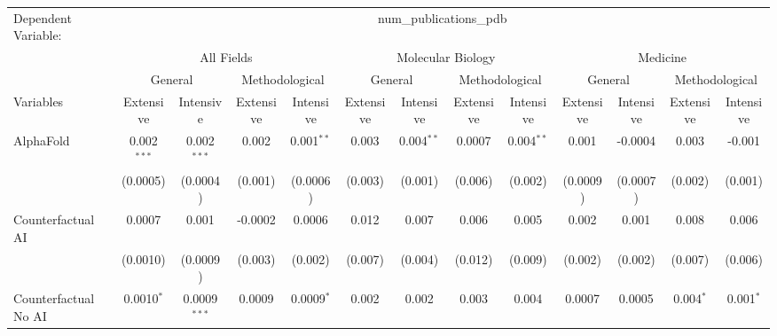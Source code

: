 \begingroup
\centering
\begin{tabular}{lcccccccccccc}
   \tabularnewline \midrule \midrule
   Dependent Variable: & \multicolumn{12}{c}{num\_publications\_pdb}\\
 & \multicolumn{4}{c}{All Fields} & \multicolumn{4}{c}{Molecular Biology} & \multicolumn{4}{c}{Medicine} \\
\cmidrule(lr){2-5} \cmidrule(lr){6-9} \cmidrule(lr){10-13}
 & \multicolumn{2}{c}{General} & \multicolumn{2}{c}{Methodological} & \multicolumn{2}{c}{General} & \multicolumn{2}{c}{Methodological} & \multicolumn{2}{c}{General} & \multicolumn{2}{c}{Methodological} \\
\cmidrule(lr){2-3} \cmidrule(lr){4-5} \cmidrule(lr){6-7} \cmidrule(lr){8-9} \cmidrule(lr){10-11} \cmidrule(lr){12-13}
Variables & \multicolumn{1}{c}{Extensive} & \multicolumn{1}{c}{Intensive} & \multicolumn{1}{c}{Extensive} & \multicolumn{1}{c}{Intensive} & \multicolumn{1}{c}{Extensive} & \multicolumn{1}{c}{Intensive} & \multicolumn{1}{c}{Extensive} & \multicolumn{1}{c}{Intensive} & \multicolumn{1}{c}{Extensive} & \multicolumn{1}{c}{Intensive} & \multicolumn{1}{c}{Extensive} & \multicolumn{1}{c}{Intensive} \\
\cmidrule(lr){1-1}\cmidrule(lr){2-2} \cmidrule(lr){3-3} \cmidrule(lr){4-4} \cmidrule(lr){5-5} \cmidrule(lr){6-6} \cmidrule(lr){7-7} \cmidrule(lr){8-8} \cmidrule(lr){9-9} \cmidrule(lr){10-10} \cmidrule(lr){11-11} \cmidrule(lr){12-12} \cmidrule(lr){13-13}
   AlphaFold                                & 0.002$^{***}$ & 0.002$^{***}$  & 0.002   & 0.001$^{**}$ & 0.003   & 0.004$^{**}$ & 0.0007  & 0.004$^{**}$ & 0.001    & -0.0004  & 0.003       & -0.001\\   
                                            & (0.0005)      & (0.0004)       & (0.001) & (0.0006)     & (0.003) & (0.001)      & (0.006) & (0.002)      & (0.0009) & (0.0007) & (0.002)     & (0.001)\\   
   Counterfactual AI                        & 0.0007        & 0.001          & -0.0002 & 0.0006       & 0.012   & 0.007        & 0.006   & 0.005        & 0.002    & 0.001    & 0.008       & 0.006\\   
                                            & (0.0010)      & (0.0009)       & (0.003) & (0.002)      & (0.007) & (0.004)      & (0.012) & (0.009)      & (0.002)  & (0.002)  & (0.007)     & (0.006)\\   
   Counterfactual No AI                     & 0.0010$^{*}$  & 0.0009$^{***}$ & 0.0009  & 0.0009$^{*}$ & 0.002   & 0.002        & 0.003   & 0.004        & 0.0007   & 0.0005   & 0.004$^{*}$ & 0.001$^{*}$\\   

\end{tabular}
